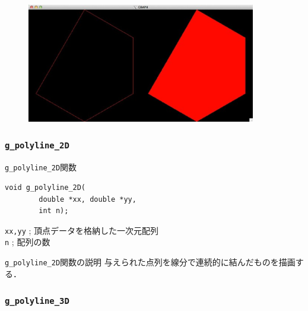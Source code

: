 \documentclass[platex,a4paper,12pt]{jsarticle}%
\begin{document}
\begin{figure}[htb]
\centering
	\includegraphics[width=100mm]{./Figures/eps/Canvas_g_polygon.eps}
\end{figure}




\clearpage
\subsubsection{\texttt{g\_polyline\_2D}}

\begin{itembox}[l]{\texttt{g\_polyline\_2D}関数}
\begin{verbatim}
void g_polyline_2D(
        double *xx, double *yy,
        int n);
\end{verbatim}
\verb|xx,yy| ; 頂点データを格納した一次元配列\\
\verb|n| ; 配列の数
\end{itembox}

\begin{itembox}[l]{\texttt{g\_polyline\_2D}関数の説明}
与えられた点列を線分で連続的に結んだものを描画する．
\end{itembox}




\clearpage
\subsubsection{\texttt{g\_polyline\_3D}}
\end{document}
